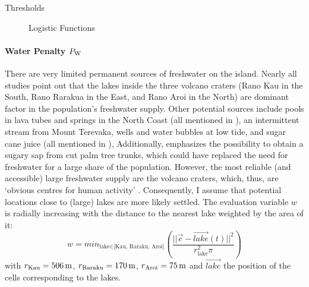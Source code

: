 \begin{table}
	Thresholds
	\label{tab:moveParameters}
\end{table}

\begin{figure}
	Logistic Functions
	\label{fig:Logistic}
\end{figure}

\paragraph{Water Penalty $P_{\rm W}$}
There are very limited permanent sources of freshwater on the island. 
Nearly all studies point out that the lakes inside the three volcano craters (Rano Kau in the South, Rano Rarakua in the East, and Rano Aroi in the North) are dominant factor in the population's freshwater supply.
Other potential sources include pools in lava tubes and springs in the North Coast (all mentioned in \citet{Bahn2017}), an intermittent stream from Mount Terevaka, wells and water bubbles at low tide, and sugar cane juice (all mentioned in \citep{Diamond2011}), 
Additionally, \citet{Mieth2015} emphasizes the possibility to obtain a sugary sap from cut palm tree trunks, which could have replaced the need for freshwater for a large share of the population.
However, the most reliable (and accessible) large freshwater supply are the volcano craters, which, thus, are `obvious centres for human activity' \citep{Bahn2017}.
Consequently, I assume that potential locations close to (large) lakes are more likely settled.
The evaluation variable $w$ is radially increasing with the distance to the nearest lake weighted by the area of it:
\begin{equation}
	w = min_{\text{lake}\in \text{[Kau, Raraku, Aroi]}} \left( \frac{||
		 \vec{c}- \vec{lake}(t)||^2}{r_\text{lake}^2\pi} \right)
\end{equation}
with $r_\text{Kau} = 506\, \rm{m}$, $r_\text{Raraku} = 170\, \rm{m}$, $r_\text{Aroi} = 75\, \rm{m}$ and $\vec{lake}$ the position of the cells corresponding to the lakes.
